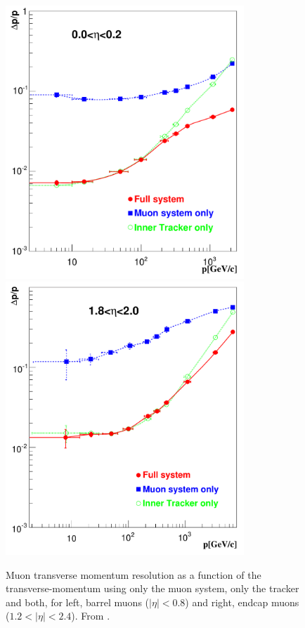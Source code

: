 \begin{figure}[htb!]
  \centering
  \includegraphics[width=0.8\textwidth]{muon_barrel}
  \includegraphics[width=0.8\textwidth]{muon_endcap}
  \caption{Muon transverse momentum resolution as a function of the
  \label{fig:MS}
transverse-momentum using only the muon system, only the tracker and both, for
left, barrel muons ($|\eta| < 0.8$) and right, endcap muons ($1.2<|\eta| <
2.4$). From \cite{cms}.}
\end{figure}


